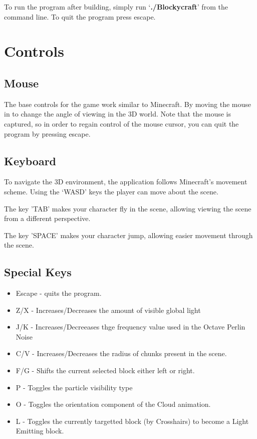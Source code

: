 \documentclass{book}
\begin{document}
To run the program after building, simply run `\textbf{./Blockycraft}' from the command line.  To quit the program press escape.

\section{Controls}
\subsection{Mouse}
The base controls for the game work similar to Minecraft.  By moving the mouse in to change the angle of viewing in the 3D world.
Note that the mouse is captured, so in order to regain control of the mouse cursor, you can quit the program by pressing escape.

\subsection{Keyboard}
To navigate the 3D environment, the application follows Minecraft's movement scheme.  Using the `WASD' keys the player can move about the scene. 

The key 'TAB' makes your character fly in the scene, allowing viewing the scene from a different perspective.
      
The key 'SPACE' makes your character jump, allowing easier movement through the scene.
      
\subsection{Special Keys}
\begin{itemize}
	\item Escape - quits the program.
	\item Z/X - Increases/Decreases the amount of visible global light
	\item J/K - Increases/Decreeases thge frequency value used in the Octave Perlin Noise
	\item C/V - Increases/Decreases the radius of chunks present in the scene.
	\item F/G - Shifts the current selected block either left or right.
	\item P - Toggles the particle visibility type
	\item O - Toggles the orientation component of the Cloud animation.
	\item L - Toggles the currently targetted block (by Crosshairs) to become a Light Emitting block.
\end{itemize}
      
\end{document}
